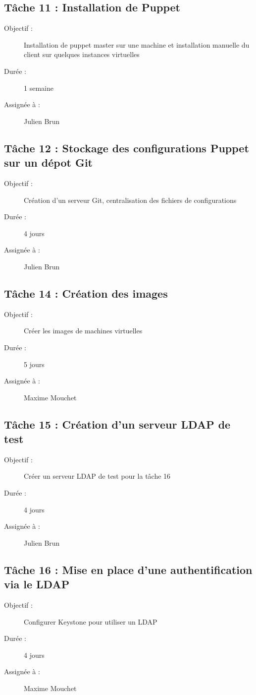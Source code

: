 \subsection*{Tâche 11 : Installation de Puppet}
\begin{description}
\item[Objectif :] Installation de puppet master sur une machine et installation manuelle du client sur quelques instances virtuelles
\item[Durée :]  1 semaine
\item[Assignée à :] Julien Brun
\end{description}

\subsection*{Tâche 12 : Stockage des configurations Puppet sur un dépot Git}
\begin{description}
\item[Objectif :] Création d’un serveur Git, centralisation des fichiers de configurations
\item[Durée :]  4 jours
\item[Assignée à :] Julien Brun
\end{description}

\subsection*{Tâche 14 : Création des images}
\begin{description}
\item[Objectif :] Créer les images de machines virtuelles
\item[Durée :]  5 jours
\item[Assignée à :] Maxime Mouchet
\end{description}

\subsection*{Tâche 15 : Création d'un serveur LDAP de test}
\begin{description}
\item[Objectif :] Créer un serveur LDAP de test pour la tâche 16
\item[Durée :]  4 jours
\item[Assignée à :] Julien Brun
\end{description}

\subsection*{Tâche 16 : Mise en place d'une authentification via le LDAP}
\begin{description}
\item[Objectif :] Configurer Keystone pour utiliser un LDAP
\item[Durée :]  4 jours
\item[Assignée à :] Maxime Mouchet
\end{description}

